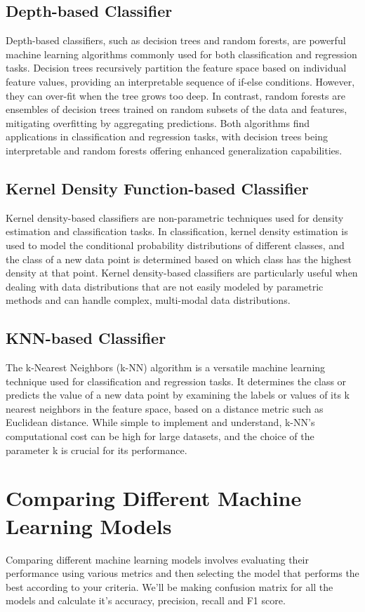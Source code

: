 \documentclass{article}
\begin{document}
\subsection{Depth-based Classifier}
Depth-based classifiers, such as decision trees and random forests, are powerful machine learning algorithms commonly used for both classification and regression tasks. Decision trees recursively partition the feature space based on individual feature values, providing an interpretable sequence of if-else conditions. However, they can over-fit when the tree grows too deep. In contrast, random forests are ensembles of decision trees trained on random subsets of the data and features, mitigating overfitting by aggregating predictions. Both algorithms find applications in classification and regression tasks, with decision trees being interpretable and random forests offering enhanced generalization capabilities.

\subsection{Kernel Density Function-based Classifier}
Kernel density-based classifiers are non-parametric techniques used for density estimation and classification tasks. In classification, kernel density estimation is used to model the conditional probability distributions of different classes, and the class of a new data point is determined based on which class has the highest density at that point. Kernel density-based classifiers are particularly useful when dealing with data distributions that are not easily modeled by parametric methods and can handle complex, multi-modal data distributions.


\subsection{KNN-based Classifier}
The k-Nearest Neighbors (k-NN) algorithm is a versatile machine learning technique used for classification and regression tasks. It determines the class or predicts the value of a new data point by examining the labels or values of its k nearest neighbors in the feature space, based on a distance metric such as Euclidean distance. While simple to implement and understand, k-NN's computational cost can be high for large datasets, and the choice of the parameter k is crucial for its performance.

\section{Comparing Different Machine Learning Models}
Comparing different machine learning models involves evaluating their performance using various metrics and then selecting the model that performs the best according to your criteria. We'll be making confusion matrix for all the models and calculate it's accuracy, precision, recall and F1 score.
\end{document}
